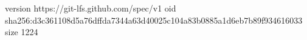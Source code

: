 version https://git-lfs.github.com/spec/v1
oid sha256:d3c361108d5a76dffda7344a63d40025c104a83b0885a1d6eb7b89f934616033
size 1224
